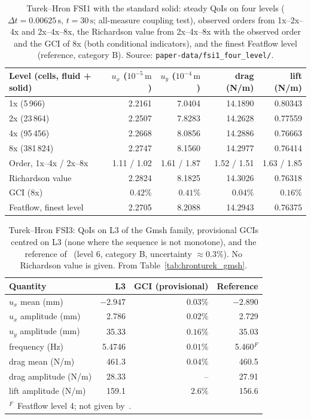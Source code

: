 \begin{table}[htbp]
	\centering
	\footnotesize
	\caption{Turek--Hron FSI1 with the standard solid: steady QoIs on four levels ($\Delta t = 0.00625\,\mathrm{s}$, $t = 30\,\mathrm{s}$; all-measure coupling test), observed orders from 1x--2x--4x and 2x--4x--8x, the Richardson value from 2x--4x--8x with the observed order and the GCI of 8x (both conditional indicators), and the finest Featflow level (reference, category B). Source: \texttt{paper-data/fsi1\_four\_level/}.}
	\label{tab:fsi1}\label{tab:refvals_fsi1}
	\begin{tabular}{lrrrr}
		\toprule
		Level (cells, fluid + solid) & $u_x$ ($10^{-5}\,\mathrm{m}$) & $u_y$ ($10^{-4}\,\mathrm{m}$) & drag (N/m) & lift (N/m) \\
		\midrule
		1x (5\,966) & 2.2161 & 7.0404 & 14.1890 & 0.80343 \\
		2x (23\,864) & 2.2507 & 7.8283 & 14.2628 & 0.77559 \\
		4x (95\,456) & 2.2668 & 8.0856 & 14.2886 & 0.76663 \\
		8x (381\,824) & 2.2747 & 8.1560 & 14.2977 & 0.76414 \\
		\midrule
		Order, 1x--4x / 2x--8x & 1.11 / 1.02 & 1.61 / 1.87 & 1.52 / 1.51 & 1.63 / 1.85 \\
		Richardson value & 2.2824 & 8.1825 & 14.3026 & 0.76318 \\
		GCI (8x) & $0.42\%$ & $0.41\%$ & $0.04\%$ & $0.16\%$ \\
		Featflow, finest level & 2.2705 & 8.2088 & 14.2943 & 0.76375 \\
		\bottomrule
	\end{tabular}
\end{table}

\begin{table}[htbp]
	\centering
	\small
	\caption{Turek--Hron FSI3: QoIs on L3 of the Gmsh family, provisional GCIs centred on L3 (none where the sequence is not monotone), and the reference of~\citet{Failer2020} (level 6, category B, uncertainty $\approx0.3\%$). No Richardson value is given. From Table~\ref{tab:hronturek_gmsh}.}
	\label{tab:refvals_fsi3}
	\begin{tabular}{lrrr}
		\toprule
		Quantity & L3 & GCI (provisional) & Reference \\
		\midrule
		$u_x$ mean (mm) & $-2.947$ & $0.03\%$ & $-2.890$ \\
		$u_x$ amplitude (mm) & 2.786 & $0.02\%$ & 2.729 \\
		$u_y$ amplitude (mm) & 35.33 & $0.16\%$ & 35.03 \\
		frequency (Hz) & 5.4746 & $0.01\%$ & 5.460$^F$ \\
		drag mean (N/m) & 461.3 & $0.04\%$ & 460.5 \\
		drag amplitude (N/m) & 28.33 & -- & 27.91 \\
		lift amplitude (N/m) & 159.1 & $2.6\%$ & 156.6 \\
		\bottomrule
		\multicolumn{4}{l}{\footnotesize $^F$~Featflow level 4; not given by~\citet{Failer2020}.}
	\end{tabular}
\end{table}

